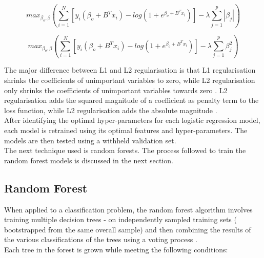 \vspace{10pt}

\begin{equation} \label{eq:L1}
max_{\beta_o, \beta}(\sum_{i=1}^{N}[y_{i}(\beta_o+B^{T}x_i)- log(1+e^{\beta_o + B^{T}x_i})] - \lambda\sum_{j=1}^{p}|\beta_{j}|)
\end{equation}

\vspace{10pt}

\begin{equation} \label{eq:L2}
max_{\beta_o, \beta}(\sum_{i=1}^{N}[y_{i}(\beta_o+B^{T}x_i)- log(1+e^{\beta_o + B^{T}x_i})] - \lambda\sum_{j=1}^{p}\beta_{j}^{2})
\end{equation}

\vspace{10pt}

The major difference between L1 and L2 regularisation is that L1 regularisation shrinks the coefficients of unimportant variables to zero, while L2 regularisation only shrinks the coefficients of unimportant variables towards zero \parencite{Hastie}. L2 regularisation adds the squared magnitude of a coefficient as penalty term to the loss function, while L2 regularisation adds the absolute magnitude \parencite{Hastie}. \\

After identifying the optimal hyper-parameters for each logistic regression model, each model is retrained using its optimal features and hyper-parameters. The models are then tested using a withheld validation set. \\

The next technique used is random forests. The process followed to train the random forest models is discussed in the next section. 

\subsection{Random Forest}

When applied to a classification problem, the random forest algorithm involves training multiple decision trees - on independently sampled training sets ( bootstrapped from the same overall sample) and then combining the results of the various classifications of the trees using a voting process \parencite{RandomForest}. \\

Each tree in the forest is grown while meeting the following conditions:

